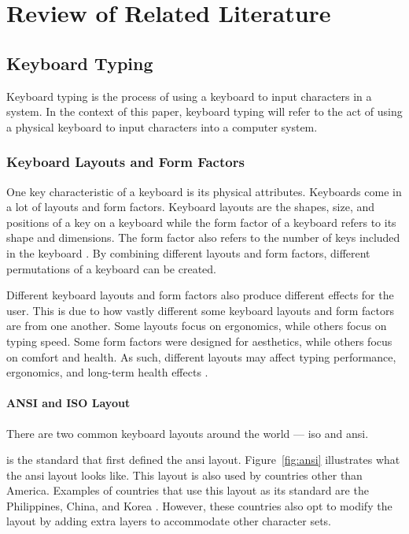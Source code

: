\documentclass{report}
\begin{document}
\chapter{Review of Related Literature}

\section{Keyboard Typing}

Keyboard typing is the process of using a keyboard to input characters in a
system. In the context of this paper, keyboard typing will refer to the act of
using a physical keyboard to input characters into a computer system.

\subsection{Keyboard Layouts and Form Factors}

One key characteristic of a keyboard is its physical attributes. Keyboards come
in a lot of layouts and form factors. Keyboard layouts are the shapes, size, and
positions of a key on a keyboard while the form factor of a keyboard refers to
its shape and dimensions. The form factor also refers to the number of keys included
in the keyboard \parencite{parkkinen2018}. By combining different layouts and
form factors, different permutations of a keyboard can be created.

Different keyboard layouts and form factors also produce different effects for
the user. This is due to how vastly different some keyboard layouts and form
factors are from one another. Some layouts focus on ergonomics, while others
focus on typing speed. Some form factors were designed for aesthetics, while
others focus on comfort and health. As such, different layouts may affect typing
performance, ergonomics, and long-term health effects \parencite{ciobanu2015}.

\subsubsection{ANSI and ISO Layout}

There are two common keyboard layouts around the world --- \ac{iso} and \ac{ansi}.

\citeauthor{ansi} is the standard that first defined the \ac{ansi} layout.
Figure~\ref{fig:ansi} illustrates what the \ac{ansi} layout looks like. This
layout is also used by countries other than America. Examples of countries that
use this layout as its standard are the Philippines, China, and Korea
\parencite{apple-layout}. However, these countries also opt to modify the layout
by adding extra layers to accommodate other character sets.
\end{document}
